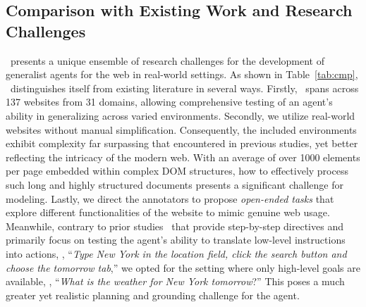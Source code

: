 
\subsection{Comparison with Existing Work and Research Challenges}

\mind\ presents a unique ensemble of research challenges for the development of generalist agents for the web in real-world settings.
As shown in Table~\ref{tab:cmp}, \mind\ distinguishes itself from existing literature in several ways.
Firstly, \mind\ spans across \num{137} websites from \num{31} domains, allowing comprehensive testing of an agent's ability in generalizing across varied environments.
Secondly, we utilize real-world websites without manual simplification. Consequently, the included environments exhibit complexity far surpassing that encountered in previous studies, yet better reflecting the intricacy of the modern web. With an average of over \num{1000} elements per page embedded within complex DOM structures, how to effectively process such long and highly structured documents presents a significant challenge for modeling.
Lastly, we direct the annotators to propose \textit{open-ended tasks} that explore different functionalities of the website to mimic genuine web usage.
Meanwhile, contrary to prior studies~\cite{Liu2018ReinforcementLO,Xu2021GroundingOI,Li2020MappingNL,Burns2022ADF} that provide step-by-step directives and primarily focus on testing the agent's ability to translate low-level instructions into actions, \eg, ``\textit{Type New York in the location field, click the search button and choose the tomorrow tab},'' we opted for the setting where only high-level goals are available, \eg, ``\textit{What is the weather for New York tomorrow}?'' This poses a much greater yet realistic planning and grounding challenge for the agent.
